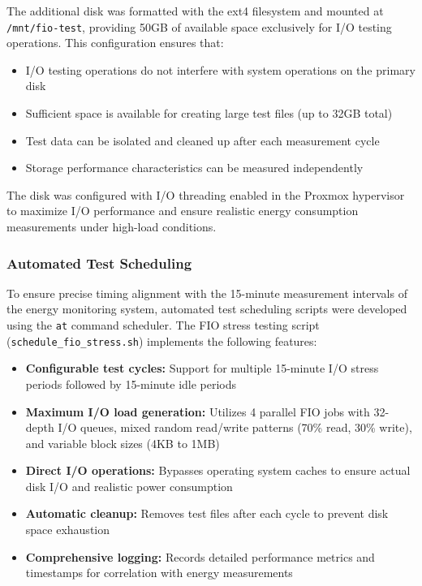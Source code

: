The additional disk was formatted with the ext4 filesystem and mounted at \texttt{/mnt/fio-test},
providing 50GB of available space exclusively for I/O testing operations. This configuration
ensures that:

\begin{itemize}
    \item I/O testing operations do not interfere with system operations on the primary disk
    \item Sufficient space is available for creating large test files (up to 32GB total)
    \item Test data can be isolated and cleaned up after each measurement cycle
    \item Storage performance characteristics can be measured independently
\end{itemize}

The disk was configured with I/O threading enabled in the Proxmox hypervisor to maximize I/O
performance and ensure realistic energy consumption measurements under high-load conditions.

\subsubsection{Automated Test Scheduling}
\label{methodology:automated-test-scheduling}
To ensure precise timing alignment with the 15-minute measurement intervals of the energy
monitoring system, automated test scheduling scripts were developed using the \texttt{at}
command scheduler. The FIO stress testing script (\texttt{schedule\_fio\_stress.sh}) implements
the following features:

\begin{itemize}
    \item \textbf{Configurable test cycles:} Support for multiple 15-minute I/O stress periods
    followed by 15-minute idle periods
    \item \textbf{Maximum I/O load generation:} Utilizes 4 parallel FIO jobs with 32-depth I/O queues,
    mixed random read/write patterns (70\% read, 30\% write), and variable block sizes (4KB to 1MB)
    \item \textbf{Direct I/O operations:} Bypasses operating system caches to ensure actual disk I/O
    and realistic power consumption
    \item \textbf{Automatic cleanup:} Removes test files after each cycle to prevent disk space
    exhaustion
    \item \textbf{Comprehensive logging:} Records detailed performance metrics and timestamps
    for correlation with energy measurements
\end{itemize}

